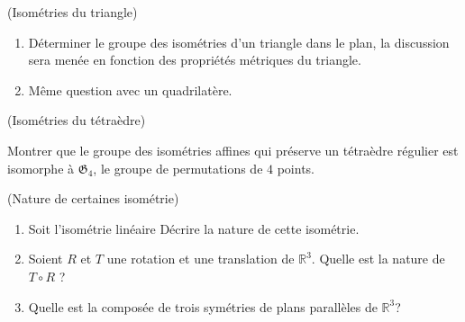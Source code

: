 \documentclass[a4paper,12pt,reqno]{amsart}
\begin{document}
\begin{exo} (Isométries du triangle)
  \begin{enumerate}
    \item Déterminer le groupe des isométries d'un triangle dans le plan, la discussion sera menée en fonction des propriétés métriques du triangle.
    \item Même question avec un quadrilatère.
  \end{enumerate}
\end{exo}

\begin{exo} (Isométries du tétraèdre)

    Montrer que le groupe des isométries affines qui préserve un tétraèdre régulier est isomorphe à $\mathfrak{G}_{4}$, le groupe de permutations de $4$ points.
\end{exo}

\begin{exo} (Nature de certaines isométrie)
  \begin{enumerate}
    \item Soit l'isométrie linéaire%
      \scalebox{.7}{
        $
          \begin{pmatrix}
            0 & 0 & 1 \\
            1 & 0 & 0 \\
            0 & 1 & 0
          \end{pmatrix}
        $.
      }
      Décrire la nature de cette isométrie.
    \item Soient $R$ et $T$ une rotation et une translation de $\mathbb{R}^{3}$. Quelle est la nature de $T \circ R$ ?
    \item Quelle est la composée de trois symétries de plans parallèles de $\mathbb{R}^{3}$?
  \end{enumerate}
\end{exo}
\end{document}
